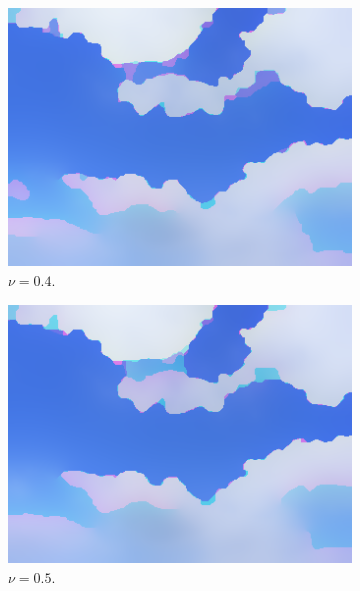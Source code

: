\documentclass[abstracton]{scrreprt}
\begin{document}
\begin{figure}[!ht]
\begin{subfigure}[b]{0.16\textwidth}
                    \includegraphics[width=\textwidth]{img/segmentation/rt/04blue.png}
                    \caption{$\nu = 0.4$.}
                \end{subfigure}
                \begin{subfigure}[b]{0.16\textwidth}
                    \includegraphics[width=\textwidth]{img/segmentation/rt/05blue.png}
                    \caption{$\nu = 0.5$.}
                \end{subfigure}
                \begin{subfigure}[b]{0.16\textwidth}

\end{subfigure}
\end{figure}
\end{document}
